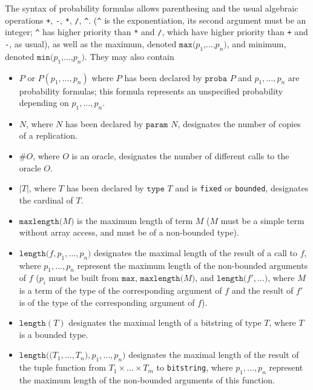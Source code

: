 The syntax of probability formulas allows parenthesing and the usual
algebraic operations \texttt{+}, \texttt{-}, \texttt{*}, \texttt{/}, \texttt{\^{ }}.
(\texttt{\^{ }} is the exponentiation, its second argument must be an integer; 
\texttt{\^{ }} has higher priority than \texttt{*} and \texttt{/}, 
which have higher priority than \texttt{+} and
\texttt{-}, as usual), as well as the maximum, denoted 
$\texttt{max(}p_1\texttt{,}\ldots\texttt{,}p_n\texttt{)}$, and
minimum, denoted $\texttt{min(}p_1\texttt{,}\ldots\texttt{,}p_n\texttt{)}$. 
They may also contain 
\begin{itemize}

\item $P$ or $P(p_1, \ldots,
p_n)$ where $P$ has been declared by $\texttt{proba }P$ and $p_1,
\ldots, p_n$ are probability formulas; this formula represents an
unspecified probability depending on $p_1, \ldots, p_n$. 

\item $N$, where $N$ has been declared by $\texttt{param }N$,
designates the number of copies of a replication.

\item $\#O$, where $O$ is an oracle,
designates the number of different calls to the oracle $O$. 

\item $|T|$, where
$T$ has been declared by $\texttt{type }T$ and is \texttt{fixed}
or \texttt{bounded}, designates the cardinal of $T$.

\item $\texttt{maxlength(}M\texttt{)}$ is the maximum
length of term $M$ ($M$ must be a simple term without array access, 
and must be of a non-bounded type).

\item $\texttt{length(}f, p_1, \ldots, p_n\texttt{)}$ designates the maximal
length of the result of a call to $f$, where $p_1, \ldots, p_n$
represent the maximum length of the non-bounded arguments of $f$
($p_i$ must be built from $\texttt{max}$,
$\texttt{maxlength(}M\texttt{)}$, and $\texttt{length(}f', \ldots
\texttt{)}$, where $M$ is a term of the type of the corresponding
argument of $f$ and the result of $f'$ is of the type of the
corresponding argument of $f$).

\item $\texttt{length}(T)$ designates the maximal 
length of a bitstring of type $T$, where $T$ is a bounded type.

\item $\texttt{length((}T_1, \ldots, T_n\texttt{)}, p_1, \ldots,
p_n\texttt{)}$ designates the maximal length of the result of the
tuple function from $T_1 \times \ldots \times T_m$ to
\texttt{bitstring}, where $p_1, \ldots, p_n$ represent the maximum
length of the non-bounded arguments of this function.


\end{itemize}
